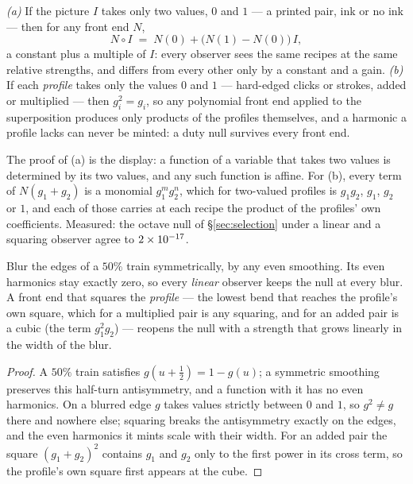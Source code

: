 \begin{corollary}
\label{cor:hard}
\emph{(a)} If the picture $I$ takes only two values, $0$ and $1$ --- a
printed pair, ink or no ink --- then for any front end $N$,
\[
  N\circ I \;=\; N(0)+\big(N(1)-N(0)\big)\,I ,
\]
a constant plus a multiple of $I$: every observer sees the same recipes at
the same relative strengths, and differs from every other only by a
constant and a gain. \emph{(b)} If each \emph{profile} takes only the values
$0$ and $1$ --- hard-edged clicks or strokes, added or multiplied --- then
$g_i^2=g_i$, so any polynomial front end applied to the superposition
produces only products of the profiles themselves, and a harmonic a profile
lacks can never be minted: a duty null survives every front end.
\end{corollary}

The proof of (a) is the display: a function of a variable that takes two
values is determined by its two values, and any such function is affine.
For (b), every term of $N(g_1+g_2)$ is a monomial $g_1^{m}g_2^{n}$, which
for two-valued profiles is $g_1g_2$, $g_1$, $g_2$ or $1$, and each of those
carries at each recipe the product of the profiles' own coefficients.
Measured: the octave null of \S\ref{sec:selection} under a linear and a
squaring observer agree to $2\times 10^{-17}$.

\begin{corollary}
\label{cor:soft}
Blur the edges of a $50\%$ train symmetrically, by any even smoothing. Its
even harmonics stay exactly zero, so every \emph{linear} observer keeps the
null at every blur. A front end that squares the \emph{profile} --- the
lowest bend that reaches the profile's own square, which for a multiplied
pair is any squaring, and for an added pair is a cubic (the term
$g_1^2g_2$) --- reopens the null with a strength that grows linearly in the
width of the blur.
\end{corollary}

\begin{proof}
A $50\%$ train satisfies $g(u+\tfrac12)=1-g(u)$; a symmetric smoothing
preserves this half-turn antisymmetry, and a function with it has no even
harmonics. On a blurred edge $g$ takes values strictly between $0$ and $1$,
so $g^2\ne g$ there and nowhere else; squaring breaks the antisymmetry
exactly on the edges, and the even harmonics it mints scale with their
width. For an added pair the square $(g_1+g_2)^2$ contains $g_1$ and $g_2$
only to the first power in its cross term, so the profile's own square
first appears at the cube.
\end{proof}


